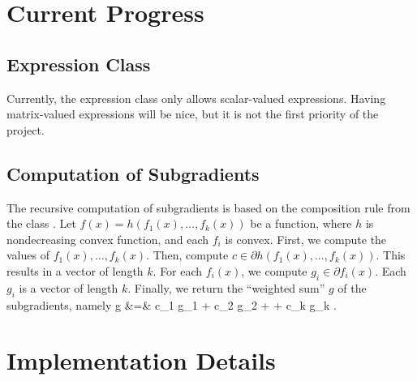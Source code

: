 \documentclass[12pt]{article}
\begin{document}
\section{Current Progress}
\subsection{Expression Class}
Currently, the expression class only allows scalar-valued expressions. Having matrix-valued expressions will be nice, but it is not the first priority of the project.

\subsection{Computation of Subgradients}
The recursive computation of subgradients is based on the composition rule from the class \cite{subg}. Let $f(x) = h(f_1(x), \ldots, f_k(x))$ be a function, where $h$ is nondecreasing convex function, and each $f_i$ is convex. First, we compute the values of $f_1(x), \ldots, f_k(x)$. Then, compute $c \in \partial h(f_1(x), \ldots, f_k(x))$. This results in a vector of length $k$. For each $f_i(x)$, we compute $g_i \in \partial f_i(x)$. Each $g_i$ is a vector of length $k$. Finally, we return the ``weighted sum'' $g$ of the subgradients, namely
\BEAS
g &=& c_1 g_1 + c_2 g_2 + \cdots + c_k g_k \; .
\EEAS

\section{Implementation Details}
\end{document}
